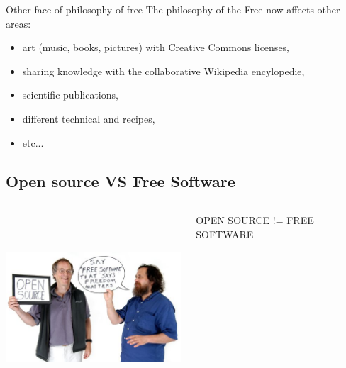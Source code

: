 \documentclass[11pt,hyperref={pdfpagemode=FullScreen}]{beamer}
\begin{document}
\begin{frame}{Other face of philosophy of free}
The philosophy of the Free now affects other areas:\newline
 \begin{itemize}
  \pause \item art (music, books, pictures) with Creative Commons licenses,
  \pause \item sharing knowledge with the collaborative Wikipedia encylopedie,
  \pause \item scientific publications,
  \pause \item different technical and recipes,
  \pause \item etc...

 \end{itemize}

\end{frame}



\subsection{Open source VS Free Software}
\begin{frame}
\begin{columns}
 \begin{column}{0.7\textwidth}
  \includegraphics[width=7cm,height=7cm]{1}
 \end{column}
 \begin{column}{0.3\textwidth}
\begin{center}
 OPEN SOURCE\newline
{}\alert{!=} \newline 
{}FREE SOFTWARE\newline
\end{center}         
               
 \end{column}

\end{columns}
\end{frame}
\end{document}
